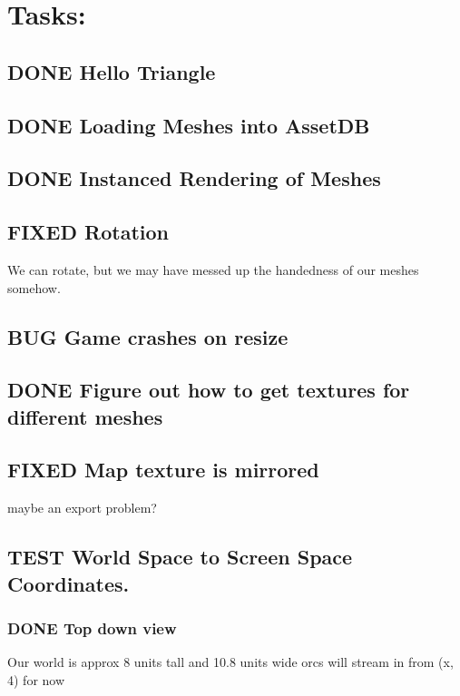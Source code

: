 \documentclass[11pt]{article}
\begin{document}
\section{Tasks:}
\label{sec:org05a9c58}
\subsection{{\bfseries\sffamily DONE} Hello Triangle}
\label{sec:org97152ab}
\subsection{{\bfseries\sffamily DONE} Loading Meshes into AssetDB}
\label{sec:orgd5716c7}
\subsection{{\bfseries\sffamily DONE} Instanced Rendering of Meshes}
\label{sec:orgd9b5ba1}
\subsection{{\bfseries\sffamily FIXED} Rotation}
\label{sec:org57a7566}
We can rotate, but we may have messed up the handedness of our meshes somehow.
\subsection{{\bfseries\sffamily BUG} Game crashes on resize}
\label{sec:org7730a3f}
\subsection{{\bfseries\sffamily DONE} Figure out how to get textures for different meshes}
\label{sec:org026455b}
\subsection{{\bfseries\sffamily FIXED} Map texture is mirrored}
\label{sec:org151b6d1}
maybe an export problem?
\subsection{{\bfseries\sffamily TEST} World Space to Screen Space Coordinates.}
\label{sec:org85cbee6}
\subsubsection{{\bfseries\sffamily DONE} Top down view}
\label{sec:org5f14bd2}
Our world is approx 8 units tall and 10.8 units wide
orcs will stream in from (x, 4) for now
\end{document}
